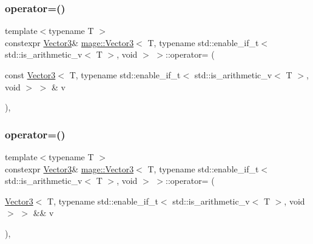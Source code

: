 \subsubsection{\texorpdfstring{operator=()}{operator=()}\hspace{0.1cm}{\footnotesize\ttfamily [1/2]}}
{\footnotesize\ttfamily template$<$typename T $>$ \\
constexpr \hyperlink{structmage_1_1_vector3}{Vector3}\& \hyperlink{structmage_1_1_vector3}{mage\+::\+Vector3}$<$ T, typename std\+::enable\+\_\+if\+\_\+t$<$ std\+::is\+\_\+arithmetic\+\_\+v$<$ T $>$, void $>$ $>$\+::operator= (\begin{DoxyParamCaption}\item[{const \hyperlink{structmage_1_1_vector3}{Vector3}$<$ T, typename std\+::enable\+\_\+if\+\_\+t$<$ std\+::is\+\_\+arithmetic\+\_\+v$<$ T $>$, void $>$ $>$ \&}]{v }\end{DoxyParamCaption})\hspace{0.3cm}{\ttfamily [default]}, {\ttfamily [noexcept]}}

\hypertarget{structmage_1_1_vector3_3_01_t_00_01typename_01std_1_1enable__if__t_3_01std_1_1is__arithmetic__v_3_01_t_01_4_00_01void_01_4_01_4_a844583be5dde6efeffec03590df850be}{}\label{structmage_1_1_vector3_3_01_t_00_01typename_01std_1_1enable__if__t_3_01std_1_1is__arithmetic__v_3_01_t_01_4_00_01void_01_4_01_4_a844583be5dde6efeffec03590df850be} 
\subsubsection{\texorpdfstring{operator=()}{operator=()}\hspace{0.1cm}{\footnotesize\ttfamily [2/2]}}
{\footnotesize\ttfamily template$<$typename T $>$ \\
constexpr \hyperlink{structmage_1_1_vector3}{Vector3}\& \hyperlink{structmage_1_1_vector3}{mage\+::\+Vector3}$<$ T, typename std\+::enable\+\_\+if\+\_\+t$<$ std\+::is\+\_\+arithmetic\+\_\+v$<$ T $>$, void $>$ $>$\+::operator= (\begin{DoxyParamCaption}\item[{\hyperlink{structmage_1_1_vector3}{Vector3}$<$ T, typename std\+::enable\+\_\+if\+\_\+t$<$ std\+::is\+\_\+arithmetic\+\_\+v$<$ T $>$, void $>$ $>$ \&\&}]{v }\end{DoxyParamCaption})\hspace{0.3cm}{\ttfamily [default]}, {\ttfamily [noexcept]}}

